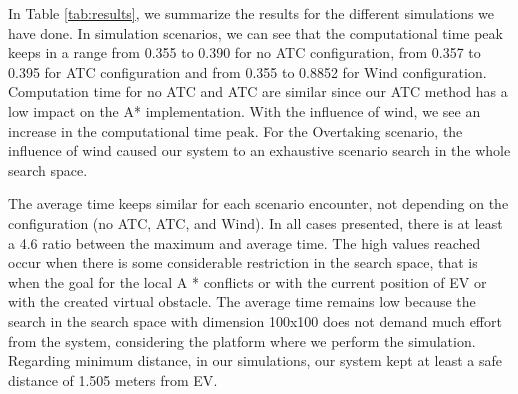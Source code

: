         In Table \ref{tab:results}, we summarize the results for the different simulations we have done. In simulation scenarios, we can see that the computational time peak keeps in a range from 0.355 to 0.390 for no \ac{ATC} configuration, from 0.357 to 0.395 for \ac{ATC} configuration and from 0.355 to 0.8852 for Wind configuration. Computation time for no \ac{ATC} and \ac{ATC} are similar since our \ac{ATC} method has a low impact on the A* implementation. With the influence of wind, we see an increase in the computational time peak. For the Overtaking scenario, the influence of wind caused our system to an exhaustive scenario search in the whole search space. 
        
        The average time keeps similar for each scenario encounter, not depending on the configuration (no \ac{ATC}, \ac{ATC}, and Wind). In all cases presented, there is at least a 4.6 ratio between the maximum and average time. The high values reached occur when there is some considerable restriction in the search space, that is when the goal for the local A * conflicts or with the current position of \ac{EV} or with the created virtual obstacle. The average time remains low because the search in the search space with dimension 100x100 does not demand much effort from the system, considering the platform where we perform the simulation.  Regarding minimum distance, in our simulations, our system kept at least a safe distance of 1.505 meters from \ac{EV}. %
    

